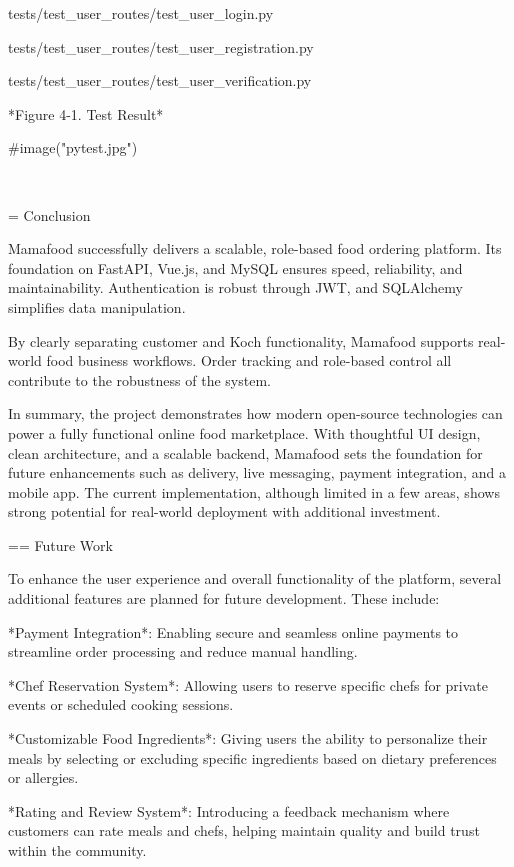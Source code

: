 tests/test_user_routes/test_user_login.py 

tests/test_user_routes/test_user_registration.py   

tests/test_user_routes/test_user_verification.py 

*Figure 4-1. Test Result*

#image("pytest.jpg")

\

= Conclusion

Mamafood successfully delivers a scalable, role-based food ordering platform. Its foundation on FastAPI, Vue.js, and MySQL ensures speed, reliability, and maintainability. Authentication is robust through JWT, and SQLAlchemy simplifies data manipulation.

By clearly separating customer and Koch functionality, Mamafood supports real-world food business workflows. Order tracking and role-based control all contribute to the robustness of the system.

In summary, the project demonstrates how modern open-source technologies can power a fully functional online food marketplace. With thoughtful UI design, clean architecture, and a scalable backend, Mamafood sets the foundation for future enhancements such as delivery, live messaging, payment integration, and a mobile app. The current implementation, although limited in a few areas, shows strong potential for real-world deployment with additional investment.

== Future Work

To enhance the user experience and overall functionality of the platform, several additional features are planned for future development. These include:

    *Payment Integration*: Enabling secure and seamless online payments to streamline order processing and reduce manual handling.

    *Chef Reservation System*: Allowing users to reserve specific chefs for private events or scheduled cooking sessions.

    *Customizable Food Ingredients*: Giving users the ability to personalize their meals by selecting or excluding specific ingredients based on dietary preferences or allergies.

    *Rating and Review System*: Introducing a feedback mechanism where customers can rate meals and chefs, helping maintain quality and build trust within the community.






